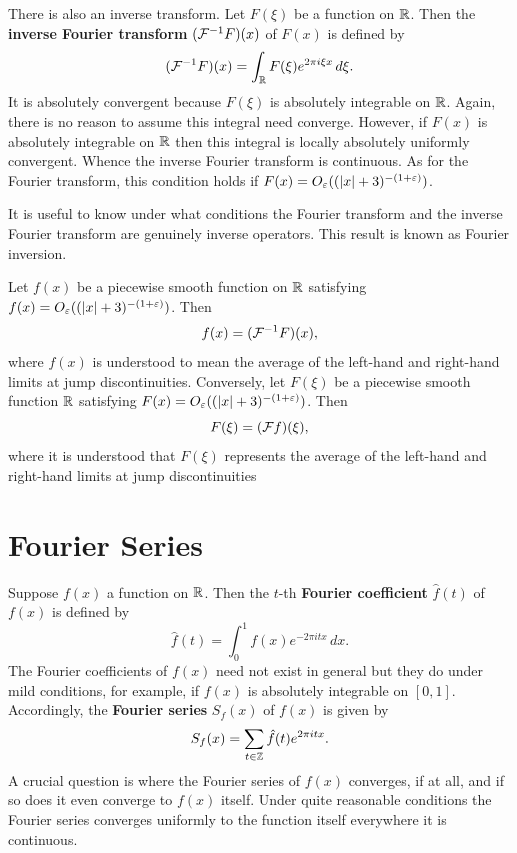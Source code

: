     There is also an inverse transform. Let \(F(\xi)\) be a function on \(\mathbb{R}\). Then the \textbf{inverse Fourier transform} \((\mathcal{F}^{-1}F)(x)\) of \(F(x)\) is defined by
    \[
      (\mathcal{F}^{-1}F)(x) = \int_{\mathbb{R}}F(\xi)e^{2\pi i\xi x}\,d\xi.
    \]
    It is absolutely convergent because \(F(\xi)\) is absolutely integrable on \(\mathbb{R}\). Again, there is no reason to assume this integral need converge. However, if \(F(x)\) is absolutely integrable on \(\mathbb{R}\) then this integral is locally absolutely uniformly convergent. Whence the inverse Fourier transform is continuous. As for the Fourier transform, this condition holds if \(F(x) = O_{\varepsilon}((|x|+3)^{-(1+\varepsilon)})\).

    It is useful to know under what conditions the Fourier transform and the inverse Fourier transform are genuinely inverse operators. This result is known as Fourier inversion.

    \begin{theorem*}
      Let \(f(x)\) be a piecewise smooth function on \(\mathbb{R}\) satisfying \(f(x) = O_{\varepsilon}((|x|+3)^{-(1+\varepsilon)})\). Then
      \[
        f(x) = (\mathcal{F}^{-1}F)(x),
      \]
      where \(f(x)\) is understood to mean the average of the left-hand and right-hand limits at jump discontinuities. Conversely, let \(F(\xi)\) be a piecewise smooth function \(\mathbb{R}\) satisfying \(F(x) = O_{\varepsilon}((|x|+3)^{-(1+\varepsilon)})\). Then
      \[
        F(\xi) = (\mathcal{F}f)(\xi),
      \]
      where it is understood that \(F(\xi)\) represents the average of the left-hand and right-hand limits at jump discontinuities
    \end{theorem*}
  \section{Fourier Series}\label{sec:Fourier_series}
    Suppose \(f(x)\) a function on \(\mathbb{R}\). Then the \(t\)-th \textbf{Fourier coefficient} \(\hat{f}(t)\) of \(f(x)\) is defined by
    \[
      \hat{f}(t) = \int_{0}^{1}f(x)e^{-2\pi itx}\,dx.
    \]
    The Fourier coefficients of \(f(x)\) need not exist in general but they do under mild conditions, for example, if \(f(x)\) is absolutely integrable on \([0,1]\). Accordingly, the \textbf{Fourier series} \(S_{f}(x)\) of \(f(x)\) is given by
    \[
      S_{f}(x) = \sum_{t \in \mathbb{Z}}\hat{f}(t)e^{2\pi itx}.
    \]
    A crucial question is where the Fourier series of \(f(x)\) converges, if at all, and if so does it even converge to \(f(x)\) itself. Under quite reasonable conditions the Fourier series converges uniformly to the function itself everywhere it is continuous.

